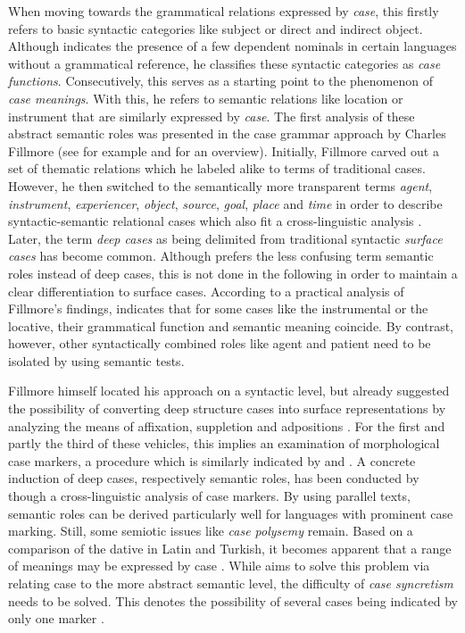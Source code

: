 \documentclass[11pt,a4paper,twoside,openright]{scrbook}
\begin{document}
When moving towards the grammatical relations expressed by \textit{case}, this firstly refers to basic syntactic categories like subject or direct and indirect object. Although \citet{blake1994case} indicates the presence of a few dependent nominals in certain languages without a grammatical reference, he classifies these syntactic categories as \textit{case functions}. Consecutively, this serves as a starting point to the phenomenon of \textit{case meanings}. With this, he refers to semantic relations like location or instrument that are similarly expressed by \textit{case}. The first analysis of these abstract semantic roles was presented in the case grammar approach by Charles Fillmore (see for example \citet{fillmore1987case} and \citep{cook1989case} for an overview). Initially, Fillmore carved out a set of thematic relations which he labeled alike to terms of traditional cases. However, he then switched to the semantically more transparent terms \textit{agent}, \textit{instrument}, \textit{experiencer}, \textit{object}, \textit{source}, \textit{goal}, \textit{place} and \textit{time} in order to describe syntactic-semantic relational cases which also fit a cross-linguistic analysis \citep{blake1994case}. Later, the term \textit{deep cases} as being delimited from traditional syntactic \textit{surface cases} has become common. Although \citet{haspelmath2012hbocas} prefers the less confusing term semantic roles instead of deep cases, this is not done in the following in order to maintain a clear differentiation to surface cases. According to a practical analysis of Fillmore's findings, \citet{blake1994case} indicates that for some cases like the instrumental or the locative, their grammatical function and semantic meaning coincide. By contrast, however, other syntactically combined roles like agent and patient need to be isolated by using semantic tests.

Fillmore himself located his approach on a syntactic level, but already suggested the possibility of converting deep structure cases into surface representations by analyzing the means of affixation, suppletion and adpositions \citep{fillmore1987case}. For the first and partly the third of these vehicles, this implies an examination of morphological case markers, a procedure which is similarly indicated by \citet{butt2006case} and \citet{grimm2011semcas}. A concrete induction of deep cases, respectively semantic roles, has been conducted by \citet{cysouw2014cas} though a cross-linguistic analysis of case markers. By using parallel texts, semantic roles can be derived particularly well for languages with prominent case marking. Still, some semiotic issues like \textit{case polysemy} remain. Based on a comparison of the dative in Latin and Turkish, it becomes apparent that a range of meanings may be expressed by case \citep{haspelmath2012hbocas}. While \citet{grimm2011semcas} aims to solve this problem via relating case to the more abstract semantic level, the difficulty of \textit{case syncretism} needs to be solved. This denotes the possibility of several cases being indicated by only one marker \citep{baerman2012hbocas}.
\end{document}
